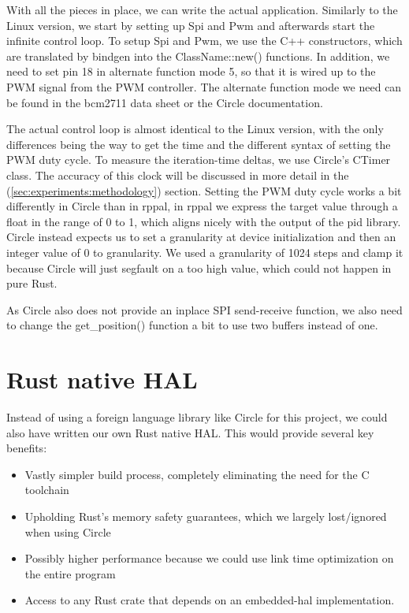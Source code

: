With all the pieces in place, we can write the actual application.
Similarly to the Linux version, we start by setting up Spi and Pwm and afterwards start the infinite control loop.
To setup Spi and Pwm, we use the C++ constructors, which are translated by bindgen into the ClassName::new() functions.
In addition, we need to set pin 18 in alternate function mode 5, so that it is wired up to the PWM signal from the PWM controller.
The alternate function mode we need can be found in the bcm2711 data sheet or the Circle documentation.



The actual control loop is almost identical to the Linux version, with the only differences being the way to get the time and the different syntax of setting the PWM duty cycle.
To measure the iteration-time deltas, we use Circle's CTimer class. The accuracy of this clock will be discussed in more detail in the  (\ref{sec:experiments:methodology}) section.
Setting the PWM duty cycle works a bit differently in Circle than in rppal,
in rppal we express the target value through a float in the range of 0 to 1,
which aligns nicely with the output of the pid library.
Circle instead expects us to set a granularity at device initialization and then an integer value of 0 to granularity.
We used a granularity of 1024 steps and clamp it because Circle will just segfault on a too high value, which could not happen in pure Rust.



As Circle also does not provide an inplace SPI send-receive function, we also need to change the get\_position() function a bit to use two buffers instead of one.


\section{Rust native HAL}
\label{sec:concept_and_implementation:hal}

Instead of using a foreign language library like Circle for this project, we could also have written our own Rust native HAL.
This would provide several key benefits:
\begin{itemize}
    \item Vastly simpler build process, completely eliminating the need for the C toolchain
    \item Upholding Rust's memory safety guarantees, which we largely lost/ignored when using Circle
    \item Possibly higher performance because we could use link time optimization on the entire program
    \item Access to any Rust crate that depends on an embedded-hal implementation.
\end{itemize}

